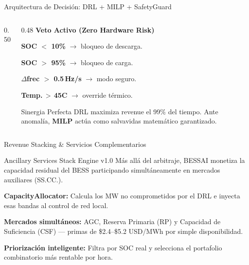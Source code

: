 \documentclass[10pt,aspectratio=169]{beamer}
\let\tempone\itemize
\let\temptwo\enditemize
\renewenvironment{itemize}{\tempone\addtolength{\itemsep}{0.3em}}{\temptwo}
\begin{document}
\begin{frame}{Arquitectura de Decisi\'on: DRL + MILP + SafetyGuard}
\begin{columns}[T]
\begin{column}{0.50\textwidth}
\begin{center}
      \end{center}
    \end{column}
    \begin{column}{0.48\textwidth}
      \textbf{\color{accentorange}Veto Activo (Zero Hardware Risk)}
      \begin{itemize}
        \item \textbf{SOC $<$ 10\%} $\rightarrow$ bloqueo de descarga.
        \item \textbf{SOC $>$ 95\%} $\rightarrow$ bloqueo de carga.
        \item \textbf{$\Delta$frec $>$ 0.5\,Hz/s} $\rightarrow$ modo seguro.
        \item \textbf{Temp.\,$>$\,45\textdegree C} $\rightarrow$ override t\'ermico.
      \end{itemize}
      \vspace{0.4cm}
      \begin{block}{Sinergia Perfecta}
        \footnotesize DRL maximiza revenue el 99\% del tiempo. Ante anomal\'ia, \textbf{MILP} act\'ua como salvavidas matem\'atico garantizado.
      \end{block}
    \end{column}
  \end{columns}
\end{frame}

\begin{frame}{Revenue Stacking \& Servicios Complementarios}
  \begin{block}{Ancillary Services Stack Engine v1.0}
    M\'as all\'a del arbitraje, BESSAI monetiza la capacidad residual del BESS participando simult\'aneamente en mercados auxiliares (SS.CC.).
  \end{block}
  \begin{itemize}
    \item \textbf{CapacityAllocator:} Calcula los MW no comprometidos por el DRL e inyecta esas bandas al control de red local.
    \item \textbf{Mercados simult\'aneos:} AGC, Reserva Primaria (RP) y Capacidad de Suficiencia (CSF) --- primas de \$2.4--\$5.2 USD/MWh por simple disponibilidad.
    \item \textbf{Priorizaci\'on inteligente:} Filtra por SOC real y selecciona el portafolio combinatorio m\'as rentable por hora.
  \end{itemize}
\end{frame}
\end{document}
